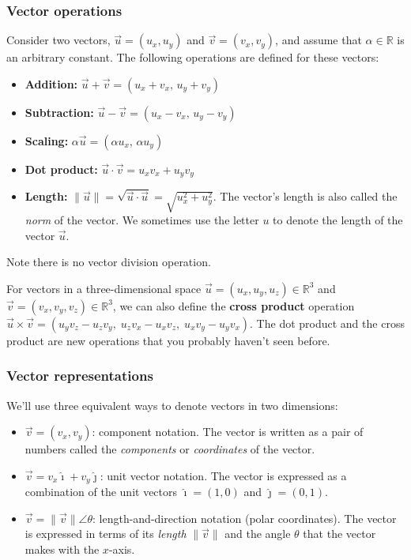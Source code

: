 		\subsubsection{Vector operations}

			Consider two vectors,
			$\vec{u}=(u_x,u_y) $ and $\vec{v}=(v_x,v_y)$,
			and assume that $\alpha \in \mathbb{R}$ is an arbitrary constant. 
			The following operations are defined for these vectors:
			\begin{itemize}
				\item 	\textbf{Addition:}	$\vec{u} + \vec{v} = (u_x+v_x,\, u_y+v_y)$
				\item 	\textbf{Subtraction:}	$\vec{u} - \vec{v} = (u_x-v_x,\, u_y-v_y)$
				\item 	\textbf{Scaling:}		$\alpha \vec{u} = (\alpha u_x,\, \alpha u_y)$
				\item 	\textbf{Dot product:}	$\vec{u} \cdot \vec{v}  = u_xv_x+u_yv_y$								
				\item 	\textbf{Length:}		$\|\vec{u}\| = \sqrt{\vec{u}\cdot\vec{u}} = \sqrt{u_x^2+u_y^2}$.
						The vector's length is also called the \emph{norm} of the vector.
						We sometimes use the letter $u$ to denote the length of the vector $\vec{u}$.
			\end{itemize}

			\noindent
			Note there is no vector division operation.

			For vectors in a three-dimensional space $\vec{u}=(u_x,u_y,u_z) \in \mathbb{R}^3$
			and $\vec{v}=(v_x,v_y,v_z) \in \mathbb{R}^3$,
			we can also define the \textbf{cross product} operation												
			$\vec{u} \times \vec{v} = (u_yv_z-u_zv_y,\; u_zv_x-u_xv_z,\; u_xv_y-u_yv_x)$.
			The dot product and the cross product are new operations that you probably haven't seen before.


		\subsubsection{Vector representations}

			We'll use three equivalent ways to denote vectors in two dimensions:
			\begin{itemize}
			    \item   	$\vec{v} =(v_x, v_y)$: component notation.
					The vector is written as a pair of numbers called the \emph{components} or \emph{coordinates} of the vector.	
			    \item 	$\vec{v} =v_x\hat{\imath}+ v_y\hat{\jmath}$: unit vector notation.
					The vector is expressed as a combination of the unit vectors
					$\hat{\imath} = (1,0)$ and $ \hat{\jmath} = (0,1)$.
			    \item   	$\vec{v}=\|\vec{v}\|\angle \theta$: length-and-direction notation (polar coordinates).
					The vector is expressed in terms of its \emph{length} $\|\vec{v}\|$
					and the angle $\theta$ that the vector makes with the $x$-axis.
			\end{itemize}


